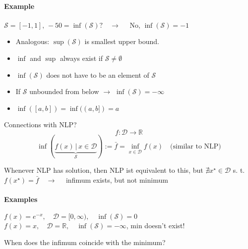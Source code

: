 \documentclass[12pt,a4paper,oneside]{scrartcl}
\begin{document}
	\paragraph{Example}
		$\mathcal{S} = [-1,1], \, -50 = \inf(\mathcal{S})?\quad\to\quad$ No, $\inf(\mathcal{S}) = -1$	
	\begin{itemize}
		\item Analogous: $\sup(\mathcal{S})$ is smallest upper bound.  
		\item $\inf$ and $\sup$ always exist if $\mathcal{S} \neq \emptyset$
		\item $\inf(\mathcal{S})$ does not have to be an element of $\mathcal{S}$
		\item If $\mathcal{S}$ unbounded from below $\to$ $\inf(\mathcal{S})=-\infty$
		\item $\inf([a,b]) = \inf((a,b]) = a$
	\end{itemize}
	
	Connections with NLP?
	\[
	f: \mathcal{D} \to \mathbb{R}
	\]
	\[
	\inf(\underset{\mathcal{S}}{\underbrace{f(x)\,|\,x\in\mathcal{D}}}):=\bar{f}=\underset{x\in\mathcal{D}}{\inf}f(x) \quad\text{(similar to NLP)}
	\]
	
	Whenever NLP has solution, then NLP ist equivalent to this, but $\nexists x^\star \in \mathcal{D}$ s. t. $f(x^\star) = \bar{f}\quad\to\quad$ infimum exists, but not minimum
	
	\paragraph{Examples}
		$f(x) = e^{-x}, \quad \mathcal{D} = [0,\infty), \quad \inf(\mathcal{S}) = 0$ \\
		$f(x) = x, \quad \mathcal{D} =\mathbb{R}, \quad \inf(\mathcal{S}) = - \infty$, min doesn't exist! 
	\begin{center}
	\end{center}
	When does the infimum coincide with the minimum?
	
\end{document}
